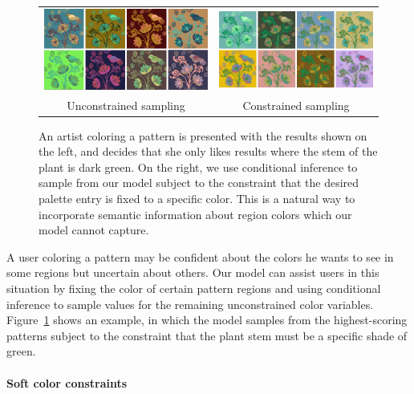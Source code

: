 \begin{figure}[ht]
\begin{tabular}{cc} 
\includegraphics[width=.475\linewidth]{figs/constrainedSearchUnconstrained}&\includegraphics[width=.475\linewidth]{figs/constrainedSearchConstrained}\\
Unconstrained sampling&Constrained sampling\\
\end{tabular}

\caption{An artist coloring a pattern is presented with the results shown on the left, and decides that she only likes results where the stem of the plant is dark green. On the right, we use conditional inference to sample from our model subject to the constraint that the desired palette entry is fixed to a specific color. This is a natural way to incorporate semantic information about region colors which our model cannot capture.}
\label{fig:constrainedInference}
\vspace{-1.0em}
\end{figure}

A user coloring a pattern may be confident about the colors he wants to see in some regions but uncertain about others. Our model can assist users in this situation by fixing the color of certain pattern regions and using conditional inference to sample values for the remaining unconstrained color variables. Figure~\ref{fig:constrainedInference} shows an example, in which the model samples from the highest-scoring patterns subject to the constraint that the plant stem must be a specific shade of green.

\paragraph{Soft color constraints}

